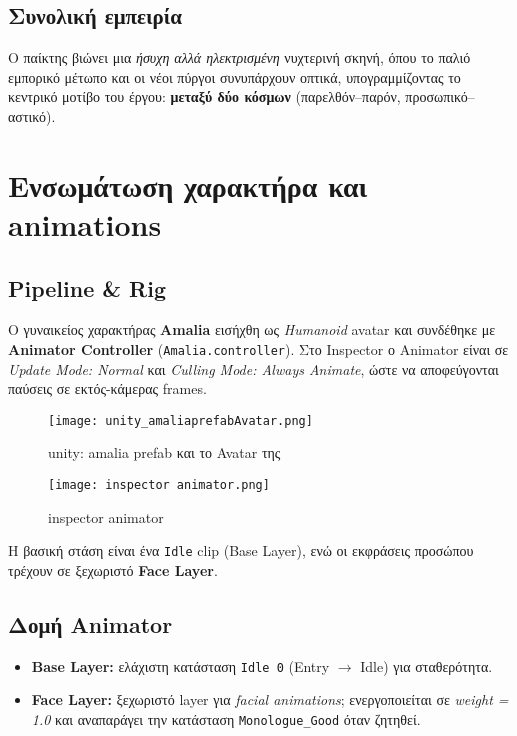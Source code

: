 \subsection*{Συνολική εμπειρία}
Ο παίκτης βιώνει μια \textit{ήσυχη αλλά ηλεκτρισμένη} νυχτερινή σκηνή, όπου το παλιό εμπορικό μέτωπο και οι νέοι πύργοι συνυπάρχουν οπτικά, υπογραμμίζοντας το κεντρικό μοτίβο του έργου: \textbf{μεταξύ δύο κόσμων} (παρελθόν–παρόν, προσωπικό–αστικό).


\section{Ενσωμάτωση χαρακτήρα και animations}
\subsection*{Pipeline \& Rig}
Ο γυναικείος χαρακτήρας \textbf{Amalia} εισήχθη ως \emph{Humanoid} avatar και συνδέθηκε με \textbf{Animator Controller} (\texttt{Amalia.controller}). Στο Inspector ο Animator είναι σε \emph{Update Mode: Normal} και \emph{Culling Mode: Always Animate}, ώστε να αποφεύγονται παύσεις σε εκτός-κάμερας frames. 
\begin{figure}[H]
    \centering
    \texttt{[image: unity\_amaliaprefabAvatar.png]}
    \caption{unity: amalia prefab και το  Avatar της}
    \label{fig:placeholder}
\end{figure}

\begin{figure}[H]
        \centering
        \texttt{[image: inspector animator.png]}
        \caption{inspector animator}
        \label{fig:placeholder}
    \end{figure}


Η βασική στάση είναι ένα \texttt{Idle} clip (Base Layer), ενώ οι εκφράσεις προσώπου τρέχουν σε ξεχωριστό \textbf{Face Layer}.

\subsection*{Δομή Animator}
\begin{itemize}
  \item \textbf{Base Layer:} ελάχιστη κατάσταση \texttt{Idle 0} (Entry $\rightarrow$ Idle) για σταθερότητα.
  \item \textbf{Face Layer:} ξεχωριστό layer για \emph{facial animations}; ενεργοποιείται σε \emph{weight = 1.0} και αναπαράγει την κατάσταση \texttt{Monologue\_Good} όταν ζητηθεί.
\end{itemize}


